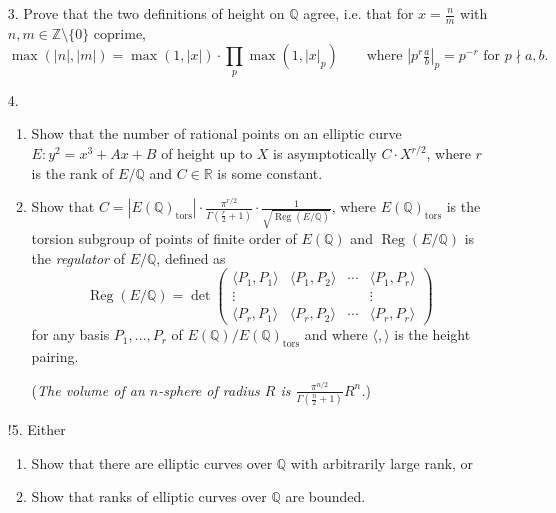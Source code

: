 \documentclass[a4paper]{article}
\theoremstyle{plain}
\theoremstyle{remark}
\theoremstyle{definition}
\DeclareMathOperator{\Reg}{Reg}
\newcommand{\tors}{\mathrm{tors}}
\newcommand{\Z}{\mathbb{Z}}
\newcommand{\Q}{\mathbb{Q}}
\newcommand{\R}{\mathbb{R}}
\begin{document}
\begin{enumerate}
    \item[3.] Prove that the two definitions of height on $\Q$ agree, i.e. that
        for $x=\frac{n}{m}$ with $n,m\in\Z\setminus\{0\}$ coprime,
        \begin{equation*}
            \max(|n|,|m|) = \max(1,|x|)\cdot\prod_p\max(1,|x|_p)
            \qquad \text{where $|p^r\tfrac{a}{b}|_p=p^{-r}$ for $p\nmid a,b$.}
        \end{equation*}

    \item[4.]
        \begin{enumerate}[label=(\roman*)]
            \item Show that the number of rational points on an elliptic curve
                $E:y^2=x^3+Ax+B$ of height up to $X$ is asymptotically
                $C\cdot X^{r/2}$, where $r$ is the rank of $E/\Q$ and $C\in\R$
                is some constant.

            \item Show that
                $C=|E(\Q)_\tors|\cdot\frac{\pi^{r/2}}{\Gamma(\frac{r}{2}+1)}
                \cdot\frac{1}{\sqrt{\Reg(E/\Q)}}$, where $E(\Q)_\tors$ is the
                torsion subgroup of points of finite order of $E(\Q)$ and
                $\Reg(E/\Q)$ is the \emph{regulator} of $E/\Q$, defined as
                \begin{equation*}
                    \Reg(E/\Q) = \det\begin{pmatrix}
                        \langle P_1,P_1\rangle & \langle P_1,P_2\rangle
                            & \cdots & \langle P_1,P_r\rangle \\
                        \vdots & & & \vdots \\
                        \langle P_r,P_1\rangle & \langle P_r,P_2\rangle
                            & \cdots & \langle P_r,P_r\rangle
                    \end{pmatrix}
                \end{equation*}
                for any basis $P_1,\ldots,P_r$ of $E(\Q)/E(\Q)_\tors$ and where
                $\langle,\rangle$ is the height pairing.

                (\textit{The volume of an $n$-sphere of radius $R$ is
                $\frac{\pi^{n/2}}{\Gamma(\frac{n}{2}+1)}R^n$.})
        \end{enumerate}

    \item[!5.] Either
        \begin{enumerate}[label=(\roman*)]
            \item Show that there are elliptic curves over $\Q$ with arbitrarily
                large rank, or
            \item Show that ranks of elliptic curves over $\Q$ are bounded.
        \end{enumerate}
\end{enumerate}
\end{document}
